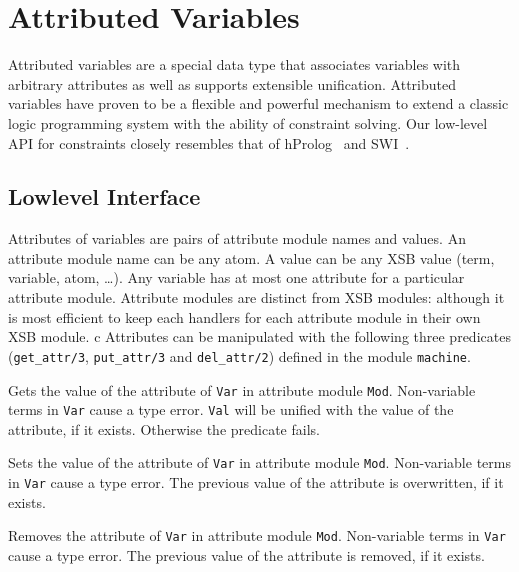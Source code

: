 \section{Attributed Variables} \label{sec:attributed-variables}

%
Attributed variables are a special data type that associates variables
with arbitrary attributes as well as supports extensible unification.
Attributed variables have proven to be a flexible and powerful
mechanism to extend a classic logic programming system with the
ability of constraint solving.  Our low-level API for constraints
closely resembles that of hProlog~\cite{hprolog} and
SWI~\cite{SWI-manual}.

\subsection{Lowlevel Interface}
%
Attributes of variables are pairs of attribute module names and
values.  An attribute module name can be any atom.  A value can be any
XSB value (term, variable, atom, \ldots). Any variable has at most one
attribute for a particular attribute module.  Attribute modules are
distinct from XSB modules: although it is most efficient to keep each
handlers for each attribute module in their own XSB module.
c
Attributes can be manipulated with the following three predicates
(\texttt{get\_attr/3}, \texttt{put\_attr/3} and \texttt{del\_attr/2})
defined in the module \texttt{machine}.

\begin{description}
%
Gets the value of the attribute of \texttt{Var} in attribute module
\texttt{Mod}. Non-variable terms in \texttt{Var} cause a type
error. \texttt{Val} will be unified with the value of the attribute,
if it exists. Otherwise the predicate fails.

%
Sets the value of the attribute of \texttt{Var} in attribute module
\texttt{Mod}. Non-variable terms in \texttt{Var} cause a type
error. The previous value of the attribute is overwritten, if it
exists.

%
Removes the attribute of \texttt{Var} in attribute module
\texttt{Mod}. Non-variable terms in \texttt{Var} cause a type
error. The previous value of the attribute is removed, if it exists.
\end{description}

